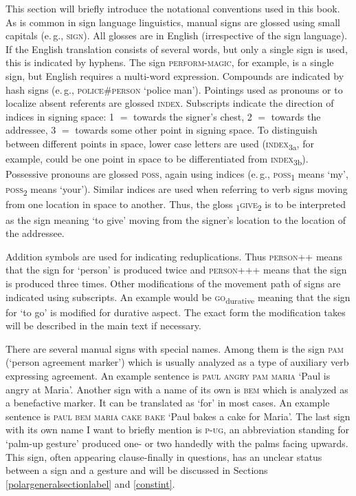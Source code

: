 \label{notational}


\begin{refsection}

This section will briefly introduce the notational conventions used in this book. As is common in sign language linguistics, manual signs are glossed using small capitals (e.\,g., \textsc{sign}). All glosses are in English (irrespective of the sign language). If the English translation consists of several words, but only a single sign is used, this is indicated by hyphens. The sign \textsc{perform-magic}, for example, is a single sign, but English requires a multi-word expression. Compounds are indicated by hash signs (e.\,g., \textsc{police\#person} `police man'). Pointings used as pronouns or to localize absent referents are glossed \textsc{index}. Subscripts indicate the direction of indices in signing space: 1 $=$ towards the signer's chest, 2 $=$ towards the addressee, 3 $=$ towards some other point in signing space. To distinguish between different points in space, lower case letters are used (\textsc{index}\textsubscript{3a}, for example, could be one point in space to be differentiated from \textsc{index}\textsubscript{3b}). Possessive pronouns are glossed \textsc{poss}, again using indices (e.\,g., \textsc{poss}\textsubscript{1} means `my', \textsc{poss}\textsubscript{2} means `your'). Similar indices are used when referring to verb signs moving from one location in space to another. Thus, the gloss \textsubscript{1}\textsc{give}\textsubscript{2} is to be interpreted as the sign meaning `to give' moving from the signer’s location to the location of the addressee. 

Addition symbols are used for indicating reduplications. Thus \textsc{person}++ means that the sign for `person' is produced twice and \textsc{person}+++ means that the sign is produced three times. Other modifications of the movement path of signs are indicated using subscripts. An example would be \textsc{go}\textsubscript{durative} meaning that the sign for `to go' is modified for durative aspect. The exact form the modification takes will be described in the main text if necessary.

There are several manual signs with special names. Among them is the sign \textsc{pam} (`person agreement marker') which is usually analyzed as a type of auxiliary verb expressing agreement. An example sentence is \textsc{paul angry pam maria} `Paul is angry at Maria'. Another sign with a name of its own is \textsc{bem} which is analyzed as a benefactive marker. It can be translated as `for' in most cases. An example sentence is \textsc{paul bem maria cake bake} `Paul bakes a cake for Maria'. The last sign with its own name I want to briefly mention is \textsc{p-ug}, an abbreviation standing for `palm-up gesture' produced one- or two handedly with the palms facing upwards. This sign, often appearing clause-finally in questions, has an unclear status between a sign and a gesture and will be discussed in Sections \ref{polargeneralsectionlabel} and \ref{constint}. 


\end{refsection}
